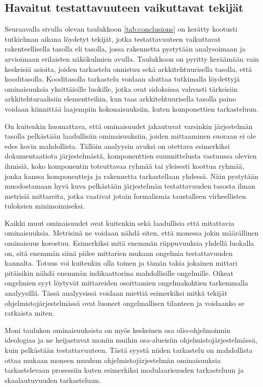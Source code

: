 \documentclass[finnish]{tktltiki2}
\numberwithin{table}{section}
\theoremstyle{definition}
\theoremstyle{remark}
\begin{document}
\subsection{Havaitut testattavuuteen vaikuttavat tekijät}

Seuraavalla sivulla olevan taulukkoon \ref{tab:conclusions} on kerätty kootusti tutkielman aikana löydetyt tekijät, jotka testattavuuteen vaikuttavat rakenteellisella tasolla eli tasolla, jossa rakennetta pystytään analysoimaan ja arvioimaan erilaisten näkökulmien avulla. Taulukkoon on pyritty keräämään vain keskeisiä asioita, joiden tarkastelu onnistuu sekä arkkitehtuurisella tasolla, että kooditasolla. Kooditasolla tarkastelu voidaan aloittaa tutkimalla löydettyjä ominaisuuksia yksittäisille luokille, jotka ovat sidoksissa vahvasti tärkeisiin arkkitehturaalisiin elementteihin, kun taas arkkitehtuurisella tasolla paino voidaan kiinnittää laajempiin kokonaisuuksiin, kuten komponettien tarkasteluun.  

On kuitenkin huomattava, että ominaisuudet jakautuvat varsinkin järjestelmän tasolla pelkästään laadullisiin ominaisuuksiin, joiden mittaaminen suoraan ei  ole edes kovin mahdollista. Tällöin analyysin avuksi on otettava esimerkiksi dokumentaatiota järjestelmästä, komponenttien suunnittelusta vastuussa olevien ihmisiä, koko komponentin toteuttavaa ryhmää tai yleisesti koottua ryhmää, jonka kanssa komponentteja ja rakennetta tarkastellaan yhdessä. Näin pystytään muodostamaan hyvä kuva pelkästään järjestelmän testattavuuden tasosta ilman metrisiä mittareita, jotka vaativat jotain formalismia taustalleen virheellisten tuloksien minimoimiseksi.

Kaikki muut ominaisuudet ovat kuitenkin sekä laadullisia että mitattavia ominaisuuksia. Metrisinä ne voidaan nähdä siten, että monessa jokin määrällinen ominaisuus korostuu. Esimerkiksi mitä enemmän riippuvuuksia yhdellä luokalla on, sitä enemmän siinä piilee mittarien mukaan ongelmia testattavuuden kannalta. Totuus voi kuitenkin olla toinen ja tämän takia jokainen mittari pitäisikin nähdä enemmän indikaattorina mahdollisille ongelmille. Oikeat ongelmien syyt löytyvät mittareiden osoittamien ongelmakohtien tarkemmalla analyysillä. Tässä analyysissä voidaan miettiä esimerkiksi mitkä tekijät ohjelmistojärjestelmässä ovat luoneet ongelmallisen tilanteen ja voidaanko se ratkaista miten. 

Moni taulukon ominaisuuksista on myös keskeinen osa olio-ohjelmoinnin ideologiaa ja ne heijastuvat moniin muihin osa-alueisiin ohjelmistojärjestelmässä, kuin pelkästään testattavuuteen. Tästä syystä niiden tarkastelu on mahdollista ottaa mukaan moneen muuhun ohjelmistojärjestelmän ominaisuuksia tarkastelevaan prosessiin kuten esimerkiksi modulaarisuuden tarkasteluun ja skaalautuvuuden tarkasteluun. 
\end{document}
